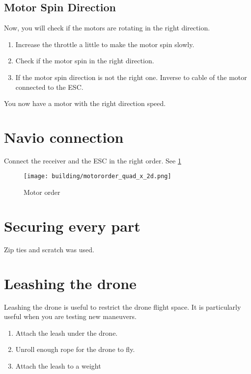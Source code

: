 \subsection{Motor Spin Direction}
Now, you will check if the motors are rotating in the right direction.

\begin{enumerate}
    \item Increase the throttle a little to make the motor spin slowly.
    \item Check if the motor spin in the right direction.
    \item If the motor spin direction is not the right one. Inverse to cable of the motor connected to the ESC.
\end{enumerate}

You now have a motor with the right direction speed.

\section{Navio connection}
Connect the receiver and the ESC in the right order. See \ref{fig:motor_order}
\begin{figure}[!ht]
    \centering
    \texttt{[image: building/motororder\_quad\_x\_2d.png]}
    \caption{Motor order}
    \label{fig:motor_order}
\end{figure}

\section{Securing every part}
Zip ties and scratch was used.


\section{Leashing the drone}
Leashing the drone is useful to restrict the drone flight space. It is particularly useful when you are testing new maneuvers.
\begin{enumerate}
    \item Attach the leash under the drone.
    \item Unroll enough rope for the drone to fly.
    \item Attach the leash to a weight
\end{enumerate}

